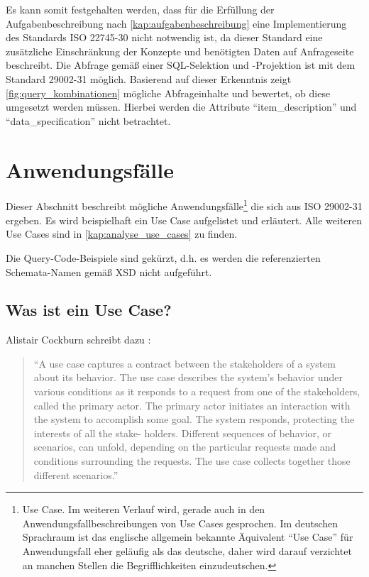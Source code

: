Es kann somit festgehalten werden, dass für die Erfüllung der Aufgabenbeschreibung nach \autoref{kap:aufgabenbeschreibung} eine Implementierung des Standards ISO 22745-30 nicht notwendig ist, da dieser Standard eine zusätzliche Einschränkung der Konzepte und benötigten Daten auf Anfrageseite beschreibt. Die Abfrage gemäß einer SQL-Selektion und -Projektion ist mit dem Standard 29002-31 möglich. Basierend auf dieser Erkenntnis zeigt \autoref{fig:query_kombinationen} mögliche Abfrageinhalte und bewertet, ob diese umgesetzt werden müssen. Hierbei werden die Attribute \enquote{item\_description} und \enquote{data\_specification} nicht betrachtet.

\section{Anwendungsfälle}\label{kap:Use_Cases}

Dieser Abschnitt beschreibt mögliche Anwendungsfälle\footnote{Use Case. Im weiteren Verlauf wird, gerade auch in den Anwendungsfallbeschreibungen von Use Cases gesprochen. Im deutschen Sprachraum ist das englische allgemein bekannte Äquivalent \enquote{Use Case} für Anwendungsfall eher geläufig als das deutsche, daher wird darauf verzichtet an manchen Stellen die Begrifflichkeiten einzudeutschen.} die sich aus ISO 29002-31 ergeben. 
Es wird beispielhaft ein Use Case aufgelistet und erläutert. Alle weiteren Use Cases sind in \autoref{kap:analyse_use_cases} zu finden. 

Die Query-Code-Beispiele sind gekürzt, d.h. es werden die referenzierten Schemata-Namen gemäß XSD nicht aufgeführt. 

\subsection{Was ist ein Use Case?}

Alistair Cockburn schreibt dazu \citep[Vergl.][Kap. 1.1]{cockburn2000}:

\begin{quotation}
\enquote{A use case captures a contract between the stakeholders of a system about its behavior. The use case describes the system’s behavior under various conditions as it responds to a request from one of the stakeholders, called the primary actor. The primary actor initiates an interaction with the system to accomplish some goal. The system responds, protecting the interests of all the stake- holders. Different sequences of behavior, or scenarios, can unfold, depending on the particular requests made and conditions surrounding the requests. The use case collects together those different scenarios.}
\end{quotation}

